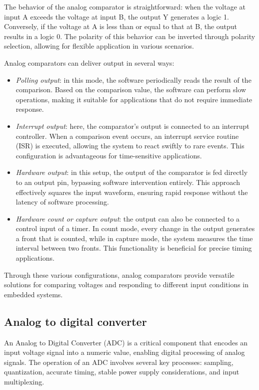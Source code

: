 The behavior of the analog comparator is straightforward: when the voltage at input A exceeds the voltage at input B, the output Y generates a logic 1. 
Conversely, if the voltage at A is less than or equal to that at B, the output results in a logic 0. 
The polarity of this behavior can be inverted through polarity selection, allowing for flexible application in various scenarios.

Analog comparators can deliver output in several ways:
\begin{itemize}
    \item \textit{Polling output}: in this mode, the software periodically reads the result of the comparison. 
        Based on the comparison value, the software can perform slow operations, making it suitable for applications that do not require immediate response.
    \item \textit{Interrupt output}: here, the comparator's output is connected to an interrupt controller. 
        When a comparison event occurs, an interrupt service routine (ISR) is executed, allowing the system to react swiftly to rare events. 
        This configuration is advantageous for time-sensitive applications.
    \item \textit{Hardware output}: in this setup, the output of the comparator is fed directly to an output pin, bypassing software intervention entirely.
        This approach effectively squares the input waveform, ensuring rapid response without the latency of software processing.
    \item \textit{Hardware count or capture output}: the output can also be connected to a control input of a timer. 
        In count mode, every change in the output generates a front that is counted, while in capture mode, the system measures the time interval between two fronts. 
        This functionality is beneficial for precise timing applications.
\end{itemize}
Through these various configurations, analog comparators provide versatile solutions for comparing voltages and responding to different input conditions in embedded systems.

\subsection{Analog to digital converter}
An Analog to Digital Converter (ADC) is a critical component that encodes an input voltage signal into a numeric value, enabling digital processing of analog signals. 
The operation of an ADC involves several key processes: sampling, quantization, accurate timing, stable power supply considerations, and input multiplexing.

